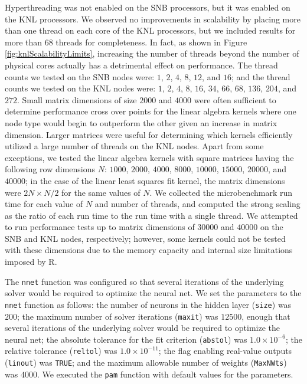 Hyperthreading was not enabled on the SNB processors, but it was enabled on the KNL
processors. We observed no improvements in scalability by placing more than one thread on
each core of the KNL processors, but we included results for more than 68 threads for
completeness. In fact, as shown in Figure \ref{fig:knlScalabilityLimits}, increasing the
number of threads beyond the number of physical cores actually has a detrimental effect on
performance. The thread counts we tested on the SNB nodes were: $1$, $2$, $4$, $8$, $12$, and
$16$; and the thread counts we tested on the KNL nodes were: $1$, $2$, $4$, $8$, $16$, $34$,
$66$, $68$, $136$, $204$, and $272$. Small matrix dimensions of size $2000$ and $4000$
were often sufficient to determine performance cross over points for the linear algebra
kernels where one node type would begin to outperform the other given an increase in
matrix dimension. Larger matrices were useful for determining which kernels efficiently
utilized a large number of threads on the KNL nodes. Apart from some
exceptions, we tested the linear algebra kernels with square matrices having the following
row dimensions $N$: $1000$, $2000$, $4000$, $8000$, $10000$, $15000$, $20000$, and
$40000$; in the case of the linear least squares fit kernel, the matrix dimensions were
$2N \times N/2$ for the same values of $N$.
We collected the microbenchmark run time for each value of $N$ and number of threads, and
computed the strong scaling as the ratio of each run time to the run time with a single
thread.  We attempted to run performance tests up to matrix
dimensions of $30000$ and $40000$ on the SNB and KNL nodes,
respectively; however, some kernels could not be tested with these dimensions due to the
memory capacity and internal size limitations imposed by R.

The \texttt{nnet} function was configured so that several iterations of the underlying
solver would be required to optimize the neural net.
We set the parameters to the \texttt{nnet} function as follows:
the number of neurons in the hidden layer (\texttt{size}) was $200$;
the maximum number of solver iterations (\texttt{maxit}) was $12500$, enough that several
iterations of the underlying solver would be required to optimize the neural net;
the absolute tolerance for the fit criterion (\texttt{abstol}) was $1.0\times 10^{-6}$;
the relative tolerance (\texttt{reltol}) was
$1.0\times 10^{-11}$;
the flag enabling real-value outputs (\texttt{linout}) was \texttt{TRUE};
and the maximum allowable number of weights (\texttt{MaxNWts}) was $4000$.
We executed the \texttt{pam} function with default values for the parameters.

